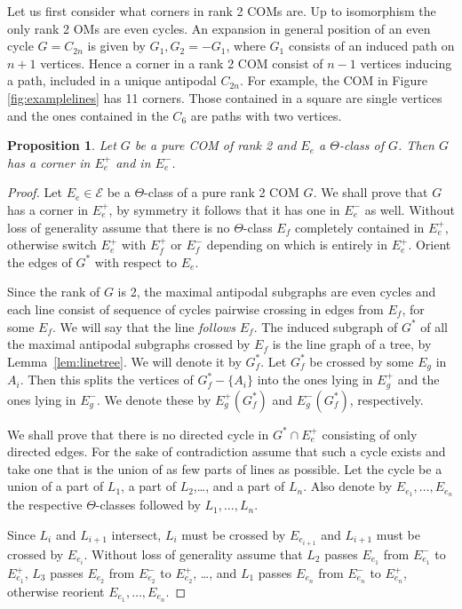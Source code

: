 \documentclass[final,11pt]{article}
\newtheorem{prop}[thm]{Proposition}%
\begin{document}
Let us first consider what corners in rank 2 COMs are. Up to isomorphism the only rank 2 OMs are even cycles. An expansion in general position of an even cycle $G= C_{2n}$ is given by $G_1, G_2=-G_1$, where $G_1$ consists of an induced path on $n+1$ vertices. Hence a corner in a rank 2 COM consist of $n-1$ vertices inducing a path, included in a unique antipodal $C_{2n}$. For example, the COM in Figure \ref{fig:examplelines} has 11 corners. Those contained in a square are single vertices and the ones contained in the $C_6$ are paths with two vertices.
\begin{prop}\label{prop:rank2corner}
Let $G$ be a pure COM of rank 2 and $E_e$ a $\Theta$-class of $G$. Then $G$ has a corner in $E_e^+$ and  in $E_e^-$.
\end{prop}
\begin{proof}
Let $E_e\in\mathcal{E}$ be a $\Theta$-class of a pure rank 2 COM $G$. We shall prove that $G$ has a corner in $E_e^+$, by symmetry it follows that it has one in $E_e^-$ as well. Without loss of generality assume that there is no $\Theta$-class $E_f$ completely contained in $E_e^+$, otherwise switch $E_e^+$ with $E_f^+$ or $E_f^-$ depending on which is entirely in $E_e^+$. Orient the edges of $G^*$ with respect to $E_e$. 

Since the rank of $G$ is 2, the maximal antipodal subgraphs are even cycles and each line consist of sequence of cycles pairwise crossing in edges from $E_f$, for some $E_f$. We will say that the line \emph{follows} $E_f$. The induced subgraph of $G^*$ of all the maximal antipodal subgraphs crossed by $E_f$ is the line graph of a tree, by Lemma~\ref{lem:linetree}. We will denote it by $G_f^*$. Let $G_f^*$ be crossed by some $E_g$ in $A_i$. Then this splits the vertices of $G_f^* - \{A_i\}$ into the ones lying in $E_g^+$ and the ones lying in $E_g^-$. We denote these by $E_g^+(G_f^*)$ and $E_g^-(G_f^*)$, respectively. 

We shall prove that there is no directed cycle in $G^* \cap E_e^+$ consisting of only directed edges. For the sake of contradiction assume that such a cycle exists and take one that is the union of as few parts of lines as possible. Let the cycle be a union of a part of $L_1$, a part of $L_2$,\ldots, and a part of $L_n$. Also denote by $E_{e_1}, \ldots, E_{e_n}$ the respective $\Theta$-classes followed by $L_1, \ldots, L_n$.

Since $L_i$ and $L_{i+1}$ intersect, $L_i$ must be crossed by $E_{e_{i+1}}$ and $L_{i+1}$ must be crossed by $E_{e_{i}}$.
Without loss of generality assume that $L_2$ passes $E_{e_1}$ from $E_{e_1}^-$ to $E_{e_1}^+$, $L_3$ passes $E_{e_2}$ from $E_{e_2}^-$ to $E_{e_2}^+$, \ldots, and $L_1$ passes $E_{e_n}$ from $E_{e_n}^-$ to $E_{e_n}^+$, otherwise reorient  $E_{e_1}, \ldots, E_{e_n}$.


\end{proof}
\end{document}
